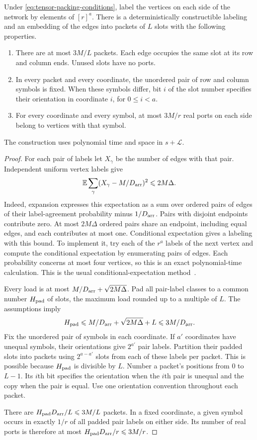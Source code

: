 \begin{lemma}\label{lem:tensor-packets}
Under \eqref{eq:tensor-packing-conditions}, label the vertices on
each side of the network by elements of $[r]^a$.  There is a
deterministically constructible labeling and an embedding of the
edges into packets of $L$ slots with the following properties.
\begin{enumerate}
\item There are at most $3M/L$ packets.  Each edge occupies the same
      slot at its row and column ends. Unused slots have no ports.
\item In every packet and every coordinate, the unordered pair of
      row and column symbols is fixed.  When these symbols differ,
      bit $i$ of the slot number specifies their orientation in
      coordinate $i$, for $0\le i<a$.
\item For every coordinate and every symbol, at most $3M/r$ real
      ports on each side belong to vertices with that symbol.
\end{enumerate}
The construction uses polynomial time and space in $s+\mathcal L$.
\end{lemma}
\begin{proof}
For each pair of labels let $X_\gamma$ be the number of edges with
that pair.  Independent uniform vertex labels give
\[
 \mathbb E\sum_\gamma (X_\gamma-M/D_{\rm arr})^2\le2M\Delta.
\]
Indeed, expansion expresses this expectation as a sum over ordered
pairs of edges of their label-agreement probability minus
$1/D_{\rm arr}$.  Pairs with disjoint endpoints contribute zero.
At most $2M\Delta$ ordered pairs share an endpoint, including equal
edges, and each contributes at most one.
Conditional expectation gives a labeling with this bound.  To
implement it, try each of the $r^a$ labels of the next vertex and
compute the conditional expectation by enumerating pairs of edges.
Each probability concerns at most four vertices, so this is an
exact polynomial-time calculation.  This is the usual
conditional-expectation method~\cite{Raghavan88}.

Every load is at most $M/D_{\rm arr}+\sqrt{2M\Delta}$.
Pad all pair-label classes to a common number $H_{\rm pad}$ of
slots, the maximum load rounded up to a multiple of $L$.
The assumptions imply
\[
 H_{\rm pad}\le M/D_{\rm arr}+\sqrt{2M\Delta}+L
              \le3M/D_{\rm arr}.
\]
Fix the unordered pair of symbols in each coordinate.  If $a'$
coordinates have unequal symbols, their orientations give
$2^{a'}$ pair labels.  Partition their padded slots into packets
using $2^{a-a'}$ slots from each of these labels per packet.
This is possible because $H_{\rm pad}$ is divisible by $L$.
Number a packet's positions from $0$ to $L-1$.  Its $i$th bit
specifies the orientation when the $i$th pair is unequal and the copy
when the pair is equal.  Use one orientation convention
throughout each packet.

There are $H_{\rm pad}D_{\rm arr}/L\le3M/L$ packets.  In a fixed
coordinate, a given symbol occurs in exactly $1/r$ of all padded
pair labels on either side.  Its number of real ports is therefore
at most $H_{\rm pad}D_{\rm arr}/r\le3M/r$.
\end{proof}

